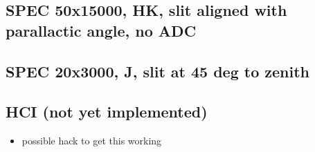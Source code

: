 \subsection{SPEC 50x15000, HK, slit aligned with parallactic angle, no ADC%
  \label{spec-50x15000-hk-slit-aligned-with-parallactic-angle-no-adc}%
}


\subsection{SPEC 20x3000, J, slit at 45 deg to zenith%
  \label{spec-20x3000-j-slit-at-45-deg-to-zenith}%
}


\subsection{HCI (not yet implemented)%
  \label{hci-not-yet-implemented}%
}

\begin{itemize}
\item possible hack to get this working
\end{itemize}
